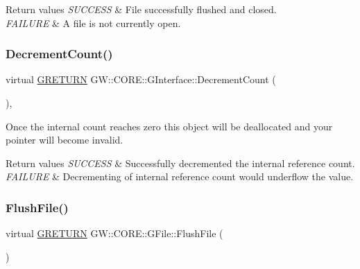 \begin{DoxyRetVals}{Return values}
{\em S\+U\+C\+C\+E\+SS} & File successfully flushed and closed. \\
\hline
{\em F\+A\+I\+L\+U\+RE} & A file is not currently open. \\
\hline
\end{DoxyRetVals}
\hypertarget{class_g_w_1_1_c_o_r_e_1_1_g_interface_af6924e12b14f217b518fc91c63d9703d}{}\label{class_g_w_1_1_c_o_r_e_1_1_g_interface_af6924e12b14f217b518fc91c63d9703d} 
\subsubsection{\texorpdfstring{Decrement\+Count()}{DecrementCount()}}
{\footnotesize\ttfamily virtual \hyperlink{namespace_g_w_a69b1aaebac1cac8049825f035884c95b}{G\+R\+E\+T\+U\+RN} G\+W\+::\+C\+O\+R\+E\+::\+G\+Interface\+::\+Decrement\+Count (\begin{DoxyParamCaption}{ }\end{DoxyParamCaption})\hspace{0.3cm}{\ttfamily [pure virtual]}, {\ttfamily [inherited]}}

Once the internal count reaches zero this object will be deallocated and your pointer will become invalid.


\begin{DoxyRetVals}{Return values}
{\em S\+U\+C\+C\+E\+SS} & Successfully decremented the internal reference count. \\
\hline
{\em F\+A\+I\+L\+U\+RE} & Decrementing of internal reference count would underflow the value. \\
\hline
\end{DoxyRetVals}
\hypertarget{class_g_w_1_1_c_o_r_e_1_1_g_file_a185d248041bf79161654a00ddb38c314}{}\label{class_g_w_1_1_c_o_r_e_1_1_g_file_a185d248041bf79161654a00ddb38c314} 
\subsubsection{\texorpdfstring{Flush\+File()}{FlushFile()}}
{\footnotesize\ttfamily virtual \hyperlink{namespace_g_w_a69b1aaebac1cac8049825f035884c95b}{G\+R\+E\+T\+U\+RN} G\+W\+::\+C\+O\+R\+E\+::\+G\+File\+::\+Flush\+File (\begin{DoxyParamCaption}{ }\end{DoxyParamCaption})\hspace{0.3cm}{\ttfamily [pure virtual]}}


